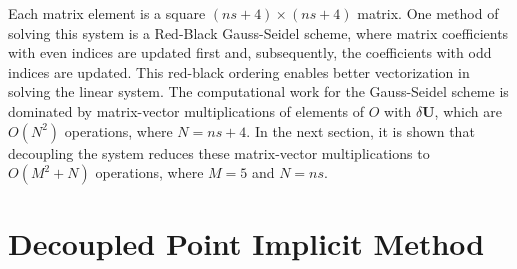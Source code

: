Each matrix element is a square $(ns+4)\times(ns+4)$ matrix.  One method of
solving this system is a Red-Black Gauss-Seidel scheme\cite{red-black}, where
matrix coefficients with even indices are updated first and, subsequently, the
coefficients with odd indices are updated.  This red-black ordering enables
better vectorization in solving the linear system.  The computational work for
the Gauss-Seidel scheme is dominated by matrix-vector multiplications of
elements of $O$ with $\delta\mathbf{U}$, which are $O(N^2)$ operations, where
$N=ns+4$.  In the next section, it is shown that decoupling the system reduces
these matrix-vector multiplications to $O(M^2 + N)$ operations, where $M=5$ and
$N=ns$.

\section{Decoupled Point Implicit Method}

